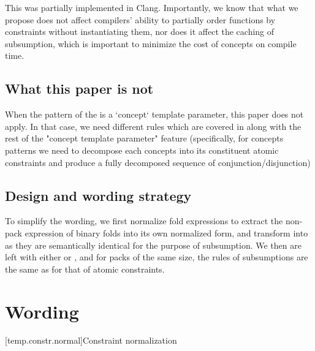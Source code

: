\documentclass{wg21}
\begin{document}
This was partially implemented in Clang.
Importantly, we know that what we propose does not affect compilers' ability to partially order functions by constraints without instantiating them, nor does it affect
the caching of subsumption, which is important to minimize the cost of concepts on compile time.

\subsection{What this paper is not}

When the pattern of the  is a `concept` template parameter, this paper does not apply. In that case, we need different rules which are covered in  along with the rest of the "concept template parameter" feature (specifically, for concepts patterns we need to decompose each concepts into its constituent atomic constraints and produce a fully decomposed sequence of conjunction/disjunction)


\subsection{Design and wording strategy}

To simplify the wording, we first normalize fold expressions to extract the non-pack expression of binary folds into its own normalized form,
and transform  into  as they are semantically identical for the purpose of subsumption.
We then are left with either  or , and for packs of the same size, the rules of subsumptions are the same as for that of atomic constraints.

\section{Wording}

[temp.constr.normal]{Constraint normalization}
%
\end{document}

